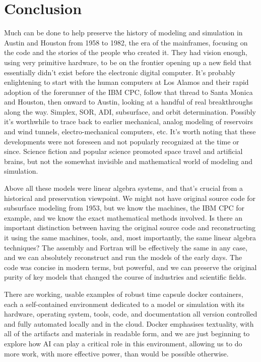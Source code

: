 \chapter{Conclusion}

Much can be done to help preserve the history of modeling and simulation in Austin and Houston from 1958 to 1982, the era of the mainframes, focusing on the code and the stories of the people who created it. They had vision enough, using very primitive hardware, to be on the frontier opening up a new field that essentially didn’t exist before the electronic digital computer. It’s probably enlightening to start with the human computers at Los Alamos and their rapid adoption of the forerunner of the IBM CPC, follow that thread to Santa Monica and Houston, then onward to Austin, looking at a handful of real breakthroughs along the way. Simplex, SOR, ADI, subsurface, and orbit determination. Possibly it’s worthwhile to trace back to earlier mechanical, analog modeling of reservoirs and wind tunnels, electro-mechanical computers, etc. It’s worth noting that these developments were not foreseen and not popularly recognized at the time or since. Science fiction and popular science promoted space travel and artificial brains, but not the somewhat invisible and mathematical world of modeling and simulation.

Above all these models were linear algebra systems, and that’s crucial from a historical and preservation viewpoint. We might not have original source code for subsurface modeling from 1953, but we know the machines, the IBM CPC for example, and we know the exact mathematical methods involved. Is there an important distinction between having the original source code and reconstructing it using the same machines, tools, and, most importantly, the same linear algebra techniques? The assembly and Fortran will be effectively the same in any case, and we can absolutely reconstruct and run the models of the early days. The code was concise in modern terms, but powerful, and we can preserve the original purity of key models that changed the course of industries and scientific fields. 

There are working, usable examples of robust time capsule docker containers, each a self-contained environment dedicated to a model or simulation with its hardware, operating system, tools, code, and documentation all version controlled and fully automated locally and in the cloud. Docker emphasises textuality, with all of the artifacts and materials in readable form, and we are just beginning to explore how AI can play a critical role in this environment, allowing us to do more work, with more effective power, than would be possible otherwise.

